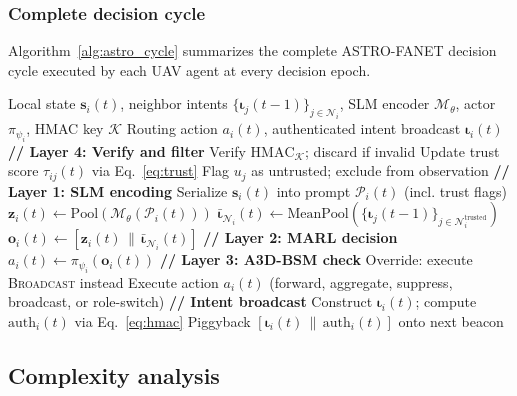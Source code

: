 \documentclass[5p,times]{elsarticle}
\begin{document}
\subsubsection{Complete decision cycle}

Algorithm~\ref{alg:astro_cycle} summarizes the complete ASTRO-FANET decision cycle executed by each UAV agent at every decision epoch.

\begin{algorithm}[t]
\caption{ASTRO-FANET Distributed Decision Cycle}
\label{alg:astro_cycle}
\begin{algorithmic}[1]
\REQUIRE Local state $\mathbf{s}_i(t)$, neighbor intents $\{\boldsymbol{\iota}_j(t{-}1)\}_{j \in \mathcal{N}_i}$, SLM encoder $\mathcal{M}_\theta$, actor $\pi_{\psi_i}$, HMAC key $\mathcal{K}$
\ENSURE Routing action $a_i(t)$, authenticated intent broadcast $\boldsymbol{\iota}_i(t)$
\STATE \textbf{// Layer 4: Verify and filter}
  \STATE Verify $\mathrm{HMAC}_{\mathcal{K}}$; discard if invalid
  \STATE Update trust score $\tau_{ij}(t)$ via Eq.~\eqref{eq:trust}
    \STATE Flag $u_j$ as untrusted; exclude from observation
  \ENDIF
\ENDFOR
\STATE \textbf{// Layer 1: SLM encoding}
\STATE Serialize $\mathbf{s}_i(t)$ into prompt $\mathcal{P}_i(t)$ (incl. trust flags)
\STATE $\mathbf{z}_i(t) \gets \text{Pool}(\mathcal{M}_\theta(\mathcal{P}_i(t)))$
\STATE $\bar{\boldsymbol{\iota}}_{\mathcal{N}_i}(t) \gets \text{MeanPool}(\{\boldsymbol{\iota}_j(t{-}1)\}_{j \in \mathcal{N}_i^{\mathrm{trusted}}})$
\STATE $\mathbf{o}_i(t) \gets [\mathbf{z}_i(t) \,\|\, \bar{\boldsymbol{\iota}}_{\mathcal{N}_i}(t)]$
\STATE \textbf{// Layer 2: MARL decision}
\STATE $a_i(t) \gets \pi_{\psi_i}(\mathbf{o}_i(t))$
\STATE \textbf{// Layer 3: A3D-BSM check}
    \STATE Override: execute \textsc{Broadcast} instead
\ENDIF
\STATE Execute action $a_i(t)$ (forward, aggregate, suppress, broadcast, or role-switch)
\STATE \textbf{// Intent broadcast}
\STATE Construct $\boldsymbol{\iota}_i(t)$; compute $\mathrm{auth}_i(t)$ via Eq.~\eqref{eq:hmac}
\STATE Piggyback $[\boldsymbol{\iota}_i(t) \,\|\, \mathrm{auth}_i(t)]$ onto next beacon
\end{algorithmic}
\end{algorithm}

\subsection{Complexity analysis}
\end{document}
